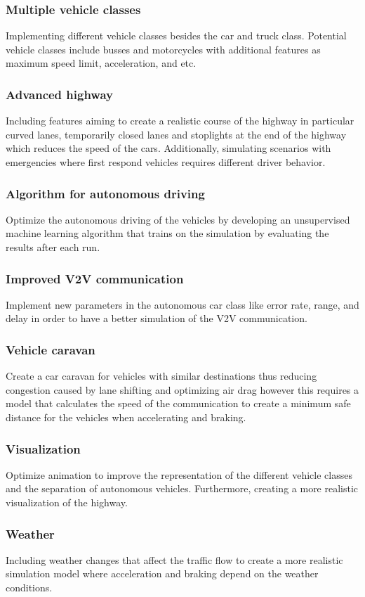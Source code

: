 \subsubsection{Multiple vehicle classes}
Implementing different vehicle classes besides the car and truck class. Potential vehicle classes include busses and motorcycles with additional features as maximum speed limit, acceleration, and etc. 
\subsubsection{Advanced highway}
Including features aiming to create a realistic course of the highway in particular curved lanes, temporarily closed lanes and stoplights at the end of the highway which reduces the speed of the cars. Additionally, simulating scenarios with emergencies where first respond vehicles requires different driver behavior.  
\subsubsection{Algorithm for autonomous driving}
Optimize the autonomous driving of the vehicles by developing an unsupervised machine learning algorithm that trains on the simulation by evaluating the results after each run.
\subsubsection{Improved V2V communication}
Implement new parameters in the autonomous car class like error rate, range, and delay in order to have a better simulation of the V2V communication. 
\subsubsection{Vehicle caravan} 
Create a car caravan for vehicles with similar destinations thus reducing congestion caused by lane shifting and optimizing air drag however this requires a model that calculates the speed of the communication to create a minimum safe distance for the vehicles when accelerating and braking.
\subsubsection{Visualization} 
Optimize animation to improve the representation of the different vehicle classes and the separation of autonomous vehicles. Furthermore, creating a more realistic visualization of the highway.
\subsubsection{Weather} 
Including weather changes that affect the traffic flow to create a more realistic simulation model where acceleration and braking depend on the weather conditions.

